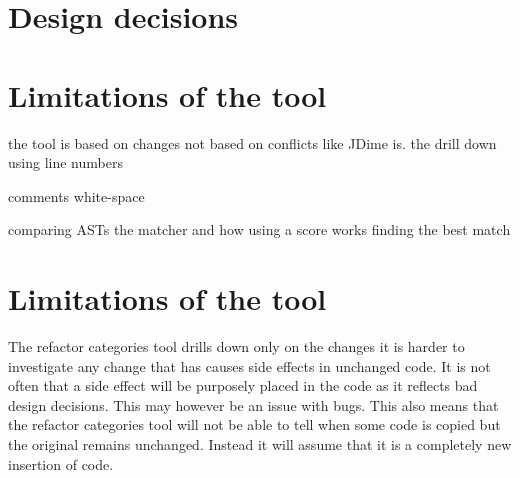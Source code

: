 

% 

\section{Design decisions}

\section{Limitations of the tool}

the tool is based on changes not based on conflicts like JDime is.
the drill down using line numbers


comments
white-space

comparing ASTs
the matcher and how using a score works
finding the best match


% 

\section{Limitations of the tool}
The refactor categories tool drills down only on the changes it is harder to investigate any change that has causes side effects in unchanged code.  It is not often that a side effect will be purposely placed in the code as it reflects bad design decisions.  This may however be an issue with bugs.  This also means that the refactor categories tool will not be able to tell when some code is copied but the original remains unchanged. Instead it will assume that it is a completely new insertion of code.
